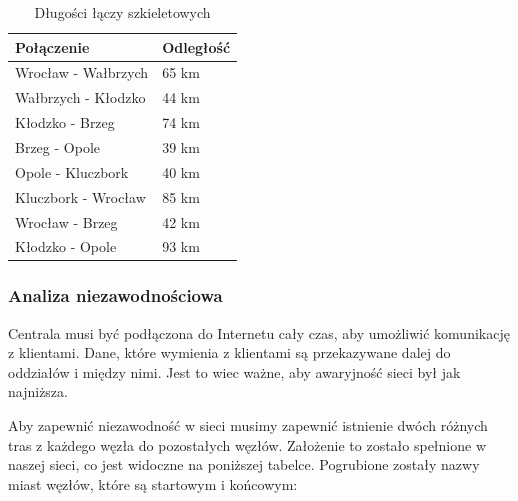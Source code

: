 \documentclass[a4paper]{article}
\begin{document}
\begin{table}[H]
	\centering
	\caption{Długości łączy szkieletowych}
	\label{my-label}
	\begin{tabular}{ll}
		\hline
		Połączenie & Odległość \\ \hline
		Wrocław - Wałbrzych & 65 km \\
		Wałbrzych - Kłodzko & 44 km \\
		Kłodzko - Brzeg & 74 km \\
		Brzeg - Opole & 39 km \\
		Opole - Kluczbork & 40 km \\
		Kluczbork - Wrocław & 85 km \\
		Wrocław - Brzeg & 42 km \\ 
        Kłodzko - Opole & 93 km \\
        \hline
	\end{tabular}
\end{table}

\newpage

\subsubsection{Analiza niezawodnościowa}

Centrala musi być podłączona do Internetu cały czas, aby umożliwić komunikację z klientami. Dane, które wymienia z klientami są przekazywane dalej do oddziałów i między nimi. Jest to wiec ważne, aby awaryjność sieci był jak najniższa. 

Aby zapewnić niezawodność w sieci musimy zapewnić istnienie dwóch różnych tras z każdego węzła do pozostałych węzłów. Założenie to zostało spełnione w naszej sieci, co jest widoczne na poniższej tabelce. Pogrubione zostały nazwy miast węzłów, które są startowym i końcowym:
\end{document}
